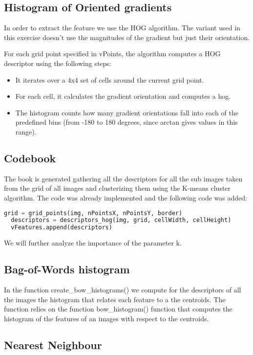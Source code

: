\documentclass{ETHExercise}
\begin{document}
\subsection{Histogram of Oriented gradients}
In order to extract the feature we use the HOG algorithm. The variant
used in this exercise doesn't use the magnitudes of the gradient but just
their orientation.

For each grid point specified in vPoints, the algorithm computes a HOG descriptor using the following steps:
\begin{itemize}
  \item It iterates over a 4x4 set of cells around the current grid point.
  \item For each cell, it calculates the gradient orientation and computes a hog.
  \item The histogram counts how many gradient orientations fall into each of the predefined bins (from -180 to 180 degrees, since arctan gives values in this range).


\end{itemize}
\subsection{Codebook}
The book is generated gathering all the descriptors for all the sub images 
taken from the grid of all images and clusterizing them using the K-means cluster
algorithm. The code was already implemented and the following code
was added:
\begin{lstlisting}[language=Python, caption=Codebook Generation]
  grid = grid_points(img, nPointsX, nPointsY, border)
  descriptors = descriptors_hog(img, grid, cellWidth, cellHeight)
  vFeatures.append(descriptors)
\end{lstlisting}

We will further analyze the importance of the parameter k.
\subsection{Bag-of-Words histogram}
In the function create\_bow\_histograms() we compute for the descriptors of all the images 
the histogram that relates each feature to a the centroids. The function
relies on the function bow\_histogram() function that computes the histogram of the features of an images
with respect to the centroids.

\subsection{Nearest Neighbour}
\end{document}
